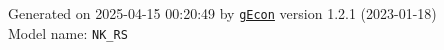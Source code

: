 \documentclass[10pt,a4paper]{article}
\numberwithin{equation}{section}
\begin{document}
\begin{landscape}
\begin{flushleft}{\large
Generated  on 2025-04-15 00:20:49 by \href{http://gecon.r-forge.r-project.org/}{\texttt{gEcon}} version 1.2.1 (2023-01-18)\\
Model name: \verb+NK_RS+
}\end{flushleft}


\end{landscape}

\end{document}
